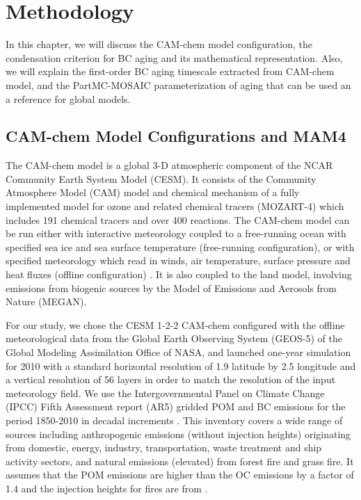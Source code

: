 \documentclass[12pt, fullpage]{uiucthesis2009}
\begin{document}
	\chapter{Methodology}
	In this chapter, we will discuss the CAM-chem model configuration, the condensation criterion for BC aging and its mathematical representation. Also, we will explain the first-order BC aging timescale extracted from CAM-chem model, and the PartMC-MOSAIC parameterization of aging that can be used an a reference for global models.
	
	\section{CAM-chem Model Configurations and MAM4}
	
	The CAM-chem model is a global 3-D atmospheric component of the NCAR Community Earth System Model (CESM). It consists of the Community Atmosphere Model (CAM) model and chemical mechanism of a fully implemented model for ozone and related chemical tracers (MOZART-4) which includes 191 chemical tracers and over 400 reactions. The CAM-chem model can be run either with interactive meteorology coupled to a free-running ocean with specified sea ice and sea surface temperature (free-running configuration), or with specified meteorology which read in winds, air temperature, surface pressure and heat fluxes (offline configuration) \citep{Lamarque2012}. It is also coupled to the land model, involving emissions from biogenic sources by the Model of Emissions and Aerosols from Nature (MEGAN). 
	
	For our study, we chose the CESM 1-2-2 CAM-chem configured with the offline meteorological data from the Global Earth Observing System (GEOS-5) of the Global Modeling Assimilation Office of NASA, and launched one-year simulation for 2010 with a standard horizontal resolution of 1.9  latitude by 2.5 longitude and a vertical resolution of 56 layers in order to match the resolution of the input meteorology field. We use the Intergovernmental Panel on Climate Change (IPCC) Fifth Assessment report (AR5) gridded POM and BC emissions for the period 1850-2010 in decadal increments \citep{Lamarque2010}. This inventory covers a wide range of sources including anthropogenic emissions (without injection heights) originating from domestic, energy, industry, transportation, waste treatment and ship activity sectors, and natural emissions (elevated) from forest fire and grass fire. It assumes that the POM emissions are higher than the OC emissions by a factor of 1.4 \citep{Liu2012} and the injection heights for fires are from \citet{dentener2006emissions}. 
\end{document}
